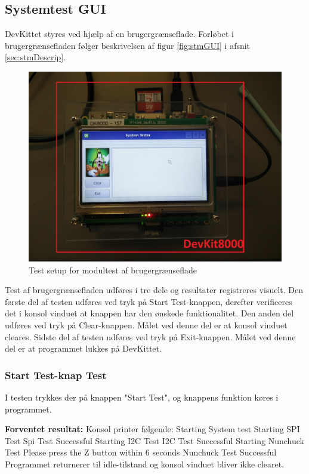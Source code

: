 \subsection{Systemtest GUI}
DevKittet styres ved hjælp af en brugergrænseflade.
Forløbet i brugergrænsefladen følger beskrivelsen af figur \ref{fig:stmGUI} i afsnit \ref{sec:stmDescrip}.

\begin{figure}[H]
	\centering
	\includegraphics[width=.5\textwidth]{Test/images/GUITest/TestSetup.jpg}
	\caption{Test setup for modultest af brugergrænseflade}
	\label{fig:GUISetup}
\end{figure}

\noindent Test af brugergrænsefladen udføres i tre dele og resultater registreres visuelt. Den første del af testen udføres ved tryk på Start Test-knappen, derefter verificeres det i konsol vinduet at knappen har den ønskede funktionalitet. Den anden del udføres ved tryk på Clear-knappen. Målet ved denne del er at konsol vinduet cleares.
Sidste del af testen udføres ved tryk på Exit-knappen. Målet ved denne del er at programmet lukkes på DevKittet.


\subsubsection{Start Test-knap Test}
I testen trykkes der på knappen "Start Test", og knappens funktion køres i programmet.\newline
 
\noindent\textbf{Forventet resultat:}\newline
\noindent Konsol printer følgende:\newline
Starting System test\newline
Starting SPI Test\newline
Spi Test Successful\newline
Starting I2C Test\newline
I2C Test Successful\newline
Starting Nunchuck Test\newline
Please press the Z button within 6 seconds\newline
Nunchuck Test Successful
\noindent Programmet returnerer til idle-tilstand og konsol vinduet bliver ikke clearet.\newline

